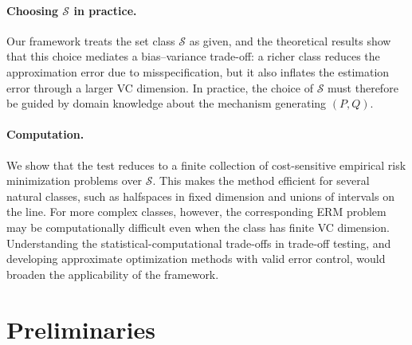 \documentclass[english]{article}
\theoremstyle{plain}
\theoremstyle{definition}
\begin{document}
\paragraph{Choosing \(\mathcal{S}\) in practice.}
Our framework treats the set class \(\mathcal{S}\) as given, and the
theoretical results show that this choice mediates a bias--variance trade-off:
a richer class reduces the approximation error due to misspecification, but it
also inflates the estimation error through a larger VC dimension. In practice,
the choice of \(\mathcal{S}\) must therefore be guided by domain knowledge
about the mechanism generating \((P,Q)\).

\paragraph{Computation.}
We show that the test reduces to a
finite collection of cost-sensitive empirical risk minimization problems over
\(\mathcal S\). This makes the method efficient for several natural classes,
such as halfspaces in fixed dimension and unions of intervals on the line. For
more complex classes, however, the corresponding ERM problem may be
computationally difficult even when the class has finite VC dimension.
Understanding the statistical-computational trade-offs in trade-off testing,
and developing approximate optimization methods with valid error control, would
broaden the applicability of the framework.





\newpage
\appendix

\section{Preliminaries}
\end{document}
